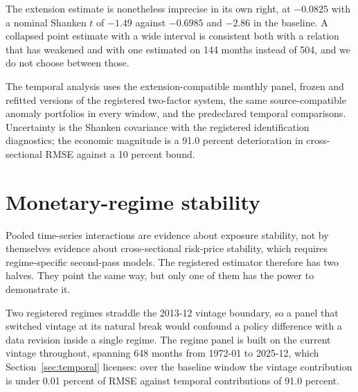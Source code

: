 \documentclass[11pt]{article}
\begin{document}
The extension estimate is nonetheless imprecise in its own right, at $-0.0825$ %
with a nominal Shanken $t$ of $-1.49$ against $-0.6985$ and $-2.86$ in the baseline. A %
collapsed point estimate with a wide interval is consistent both with a relation
that has weakened and with one estimated on 144 months instead of 504, and we do %
not choose between those. %

The temporal analysis uses the extension-compatible monthly panel, frozen and
refitted versions of the registered two-factor system, the same source-compatible
anomaly portfolios in every window, and the predeclared temporal comparisons.
Uncertainty is the Shanken covariance with the registered identification
diagnostics; the economic magnitude is a 91.0 percent deterioration in %
cross-sectional RMSE against a 10 percent bound. %

\section{Monetary-regime stability}
\label{sec:regimes}

Pooled time-series interactions are evidence about exposure stability, not by
themselves evidence about cross-sectional risk-price stability, which requires
regime-specific second-pass models. The registered estimator therefore has two
halves. They point the same way, but only one of them has the power to
demonstrate it.

Two registered regimes straddle the 2013-12 vintage boundary, so a panel that %
switched vintage at its natural break would confound a policy difference with a
data revision inside a single regime. The regime panel is built on the current
vintage throughout, spanning 648 months from 1972-01 to 2025-12, which %
Section~\ref{sec:temporal} licenses: over the baseline window the vintage
contribution is under 0.01 percent of RMSE against temporal contributions of 91.0 %
percent. %
\end{document}
